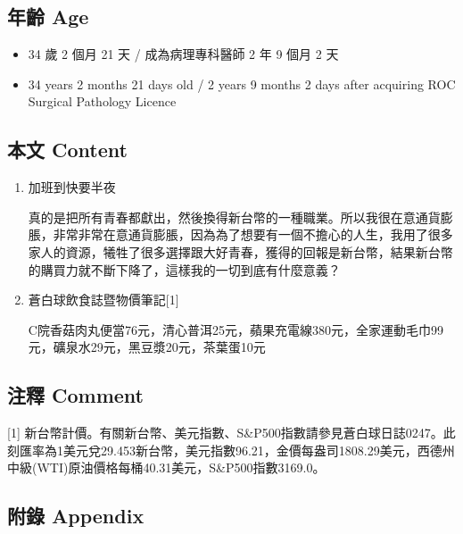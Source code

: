 \documentclass[
]{article}
\providecommand{\tightlist}{%
  \setlength{\itemsep}{0pt}\setlength{\parskip}{0pt}}
\begin{document}
\hypertarget{ux5e74ux9f61-age-13}{%
\subsection{年齡 Age}\label{ux5e74ux9f61-age-13}}

\begin{itemize}
\tightlist
\item
  34 歲 2 個月 21 天 / 成為病理專科醫師 2 年 9 個月 2 天
\item
  34 years 2 months 21 days old / 2 years 9 months 2 days after
  acquiring ROC Surgical Pathology Licence
\end{itemize}

\hypertarget{ux672cux6587-content-13}{%
\subsection{本文 Content}\label{ux672cux6587-content-13}}

\begin{enumerate}
\def\labelenumi{\arabic{enumi}.}
\item
  加班到快要半夜

  真的是把所有青春都獻出，然後換得新台幣的一種職業。所以我很在意通貨膨脹，非常非常在意通貨膨脹，因為為了想要有一個不擔心的人生，我用了很多家人的資源，犧牲了很多選擇跟大好青春，獲得的回報是新台幣，結果新台幣的購買力就不斷下降了，這樣我的一切到底有什麼意義？
\item
  蒼白球飲食誌暨物價筆記{[}1{]}

  C院香菇肉丸便當76元，清心普洱25元，蘋果充電線380元，全家運動毛巾99元，礦泉水29元，黑豆漿20元，茶葉蛋10元
\end{enumerate}

\hypertarget{ux6ce8ux91cb-comment-13}{%
\subsection{注釋 Comment}\label{ux6ce8ux91cb-comment-13}}

{[}1{]}
新台幣計價。有關新台幣、美元指數、S\&P500指數請參見蒼白球日誌0247。此刻匯率為1美元兌29.453新台幣，美元指數96.21，金價每盎司1808.29美元，西德州中級(WTI)原油價格每桶40.31美元，S\&P500指數3169.0。

\hypertarget{ux9644ux9304-appendix-13}{%
\subsection{附錄 Appendix}\label{ux9644ux9304-appendix-13}}
\end{document}
